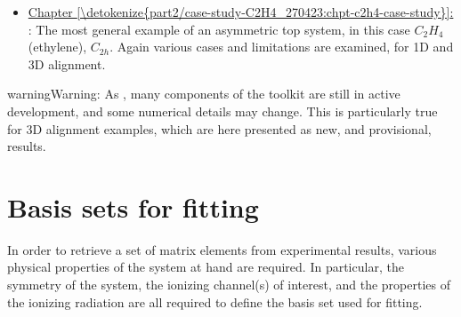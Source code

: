\documentclass[letterpaper,table,10pt,english]{jupyterBook}
\begin{document}
\begin{itemize}
\begin{itemize}
\item {} 
\sphinxAtStartPar
\hyperref[\detokenize{part2/case-study-C2H4_270423:chpt-c2h4-case-study}]{Chapter \ref{\detokenize{part2/case-study-C2H4_270423:chpt-c2h4-case-study}}:} {\hyperref[\detokenize{part2/case-study-C2H4_270423:chpt-c2h4-case-study}]{}}: The most general example of an asymmetric top system, in this case \(C_2H_4\) (ethylene), \(C_{2h}\). Again various cases and limitations are examined, for 1D and 3D alignment.

\end{itemize}

\end{itemize}

\begin{sphinxShadowBox}
\sphinxstylesidebartitle{}

\begin{sphinxadmonition}{warning}{Warning:}
\sphinxAtStartPar
As {\hyperref[\detokenize{frontmatter/book_versions_note:sec-numerics-disclaimer}]{}}, many components of the toolkit are still in active development, and some numerical details may change. This is particularly true for 3D alignment examples, which are here presented as new, and provisional, results.
\end{sphinxadmonition}
\end{sphinxShadowBox}

\sphinxstepscope


\chapter{Basis sets for fitting}
\label{\detokenize{part2/sym-fitting-intro_220423:basis-sets-for-fitting}}\label{\detokenize{part2/sym-fitting-intro_220423:sect-basis-sets-fitting-intro}}\label{\detokenize{part2/sym-fitting-intro_220423::doc}}
\sphinxAtStartPar
In order to retrieve a set of matrix elements from experimental results, various physical properties of the system at hand are required. In particular, the symmetry of the system, the ionizing channel(s) of interest, and the properties of the ionizing radiation are all required to define the basis set used for fitting.
\end{document}
